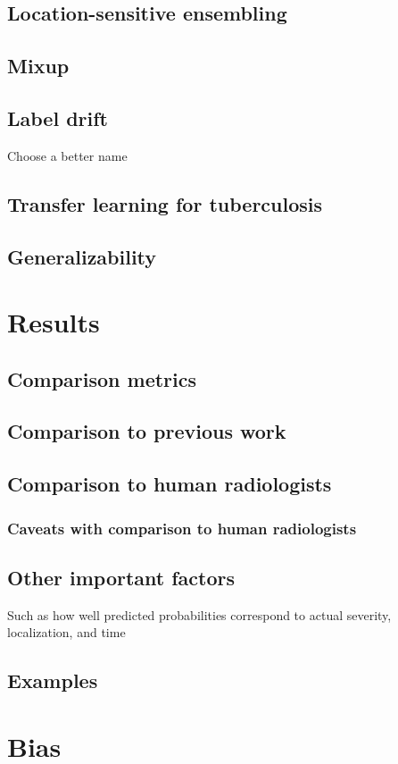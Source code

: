 \documentclass[11pt,twoside,a4paper]{report}
\begin{document}
    \section{Location-sensitive ensembling}
    \section{Mixup}
    \section{Label drift}
    Choose a better name
    \section{Transfer learning for tuberculosis}
    \section{Generalizability}
\chapter{Results}
    \section{Comparison metrics}
    \section{Comparison to previous work}
    \section{Comparison to human radiologists}
        \subsection{Caveats with comparison to human radiologists}
    \section{Other important factors}
    Such as how well predicted probabilities correspond to actual severity, localization, and time
    \section{Examples}
\chapter{Bias}
\end{document}
